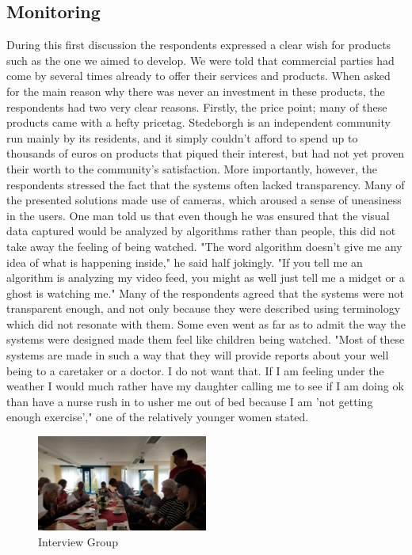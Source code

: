 \documentclass{below-ext}
\begin{document}
\subsection{Monitoring}
During this first discussion the respondents expressed a clear wish for products such as the one we aimed to develop. We were told that commercial parties had come by several times already to offer their services and products. When asked for the main reason why there was never an investment in these products, the respondents had two very clear reasons. Firstly, the price point;%
 many of these products came with a hefty pricetag. Stedeborgh is an independent community run mainly by its residents, and it simply couldn't afford to spend up to thousands of euros on products that piqued their interest, but had not yet proven their worth to the community's satisfaction. More importantly, however, the respondents stressed the fact that the systems often lacked transparency. Many of the presented solutions made use of cameras, which aroused a sense of uneasiness in the users. One man told us that even though he was ensured that the visual data captured would be analyzed by algorithms rather than people, this did not take away the feeling of being watched. "The word algorithm doesn't give me any idea of what is happening inside," he said half jokingly. "If you tell me an algorithm is analyzing my video feed, you might as well just tell me a midget or a ghost is watching me." Many of the respondents agreed that the systems were not transparent enough, and not only because they were described using terminology which did not resonate with them. Some even went as far as to admit the way the systems were designed made them feel like children being watched. %
"Most of these systems are made in such a way that they will provide reports about your well being to a caretaker or a doctor. I do not want that. If I am feeling under the weather I would much rather have my daughter calling me to see if I am doing ok than have a nurse rush in to usher me out of bed because I am 'not getting enough exercise'," one of the relatively younger women stated. 

\begin{figure}
\centering
\label{fig:interview}
\includegraphics[width=0.5\textwidth]{interview}
\caption{Interview Group}
\end{figure}
\end{document}
